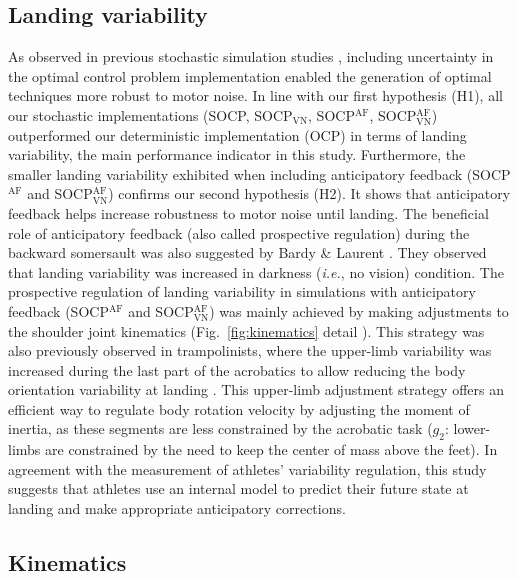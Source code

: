 \documentclass[10pt,letterpaper]{article}
\newcommand*\circled[1]{\tikz[baseline=(char.base)]{
            \node[shape=circle,draw,inner sep=2pt] (char) {#1};}}
\begin{document}
\subsection{Landing variability}

As observed in previous stochastic simulation studies \cite{van2022approximate, berret2024co}, including uncertainty in the optimal control problem implementation enabled the generation of optimal techniques more robust to motor noise. 
In line with our first hypothesis (H1), all our stochastic implementations (SOCP, SOCP$_{\text{VN}}$, SOCP$^{\text{AF}}$, SOCP$_{\text{VN}}^{\text{AF}}$) outperformed our deterministic implementation (OCP) in terms of landing variability, the main performance indicator in this study.
Furthermore, the smaller landing variability exhibited when including anticipatory feedback (SOCP$^{\text{AF}}$ and SOCP$_{\text{VN}}^{\text{AF}}$) confirms our second hypothesis (H2).
It shows that anticipatory feedback helps increase robustness to motor noise until landing.
The beneficial role of anticipatory feedback (also called prospective regulation) during the backward somersault was also suggested by Bardy \& Laurent \cite{bardy1998body}.
They observed that landing variability was increased in darkness (\textit{i.e.}, no vision) condition.   
The prospective regulation of landing variability in simulations with anticipatory feedback (SOCP$^{\text{AF}}$ and SOCP$_{\text{VN}}^{\text{AF}}$) was mainly achieved by making adjustments to the shoulder joint kinematics (Fig.~\ref{fig:kinematics} detail \circled{1}).
This strategy was also previously observed in trampolinists, where the upper-limb variability was increased during the last part of the acrobatics to allow reducing the body orientation variability at landing \cite{bourgeois2025motor}.
This upper-limb adjustment strategy offers an efficient way to regulate body rotation velocity by adjusting the moment of inertia, as these segments are less constrained by the acrobatic task ($g_2$: lower-limbs are constrained by the need to keep the center of mass above the feet).
In agreement with the measurement of athletes' variability regulation,  this study suggests that athletes use an internal model to predict their future state at landing and make appropriate anticipatory corrections.


\subsection{Kinematics}
\end{document}

